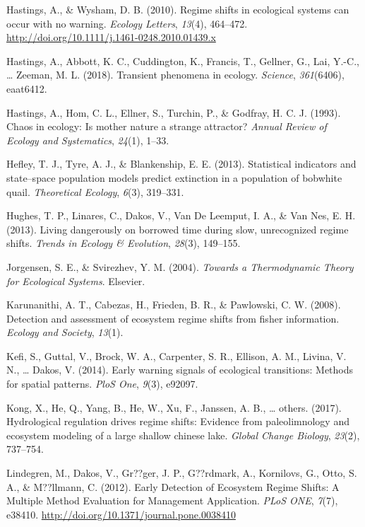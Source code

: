 \documentclass[12pt,twoside,openany]{reedthesis}
\begin{document}
\hypertarget{ref-hastings_regime_2010}{}
Hastings, A., \& Wysham, D. B. (2010). Regime shifts in ecological
systems can occur with no warning. \emph{Ecology Letters}, \emph{13}(4),
464--472. \url{http://doi.org/10.1111/j.1461-0248.2010.01439.x}

\hypertarget{ref-hastings2018transient}{}
Hastings, A., Abbott, K. C., Cuddington, K., Francis, T., Gellner, G.,
Lai, Y.-C., \ldots{} Zeeman, M. L. (2018). Transient phenomena in
ecology. \emph{Science}, \emph{361}(6406), eaat6412.

\hypertarget{ref-hastings1993chaos}{}
Hastings, A., Hom, C. L., Ellner, S., Turchin, P., \& Godfray, H. C. J.
(1993). Chaos in ecology: Is mother nature a strange attractor?
\emph{Annual Review of Ecology and Systematics}, \emph{24}(1), 1--33.

\hypertarget{ref-hefley2013statistical}{}
Hefley, T. J., Tyre, A. J., \& Blankenship, E. E. (2013). Statistical
indicators and state--space population models predict extinction in a
population of bobwhite quail. \emph{Theoretical Ecology}, \emph{6}(3),
319--331.

\hypertarget{ref-hughes_living_2013}{}
Hughes, T. P., Linares, C., Dakos, V., Van De Leemput, I. A., \& Van
Nes, E. H. (2013). Living dangerously on borrowed time during slow,
unrecognized regime shifts. \emph{Trends in Ecology \& Evolution},
\emph{28}(3), 149--155.

\hypertarget{ref-jorgensen_towards_2004}{}
Jorgensen, S. E., \& Svirezhev, Y. M. (2004). \emph{Towards a
Thermodynamic Theory for Ecological Systems}. Elsevier.

\hypertarget{ref-karunanithi_detection_2008}{}
Karunanithi, A. T., Cabezas, H., Frieden, B. R., \& Pawlowski, C. W.
(2008). Detection and assessment of ecosystem regime shifts from fisher
information. \emph{Ecology and Society}, \emph{13}(1).

\hypertarget{ref-kefi2014early}{}
Kefi, S., Guttal, V., Brock, W. A., Carpenter, S. R., Ellison, A. M.,
Livina, V. N., \ldots{} Dakos, V. (2014). Early warning signals of
ecological transitions: Methods for spatial patterns. \emph{PloS One},
\emph{9}(3), e92097.

\hypertarget{ref-kong2017hydrological}{}
Kong, X., He, Q., Yang, B., He, W., Xu, F., Janssen, A. B., \ldots{}
others. (2017). Hydrological regulation drives regime shifts: Evidence
from paleolimnology and ecosystem modeling of a large shallow chinese
lake. \emph{Global Change Biology}, \emph{23}(2), 737--754.

\hypertarget{ref-lindegren_early_2012}{}
Lindegren, M., Dakos, V., Gr??ger, J. P., G??rdmark, A., Kornilovs, G.,
Otto, S. A., \& M??llmann, C. (2012). Early Detection of Ecosystem
Regime Shifts: A Multiple Method Evaluation for Management Application.
\emph{PLoS ONE}, \emph{7}(7), e38410.
\url{http://doi.org/10.1371/journal.pone.0038410}
\end{document}
